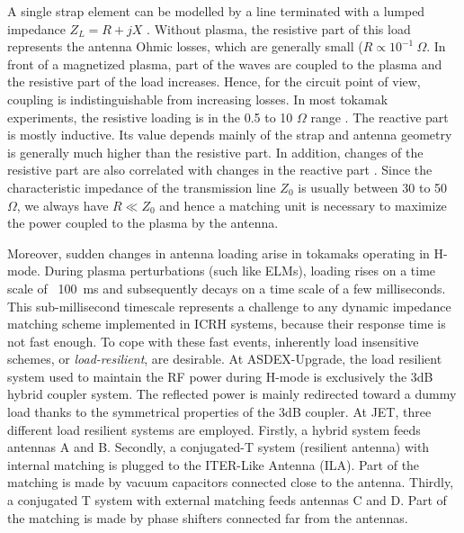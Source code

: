 A single strap element can be modelled by a line terminated with a lumped impedance $Z_L = R + j X$ . Without plasma, the resistive part of this load represents the antenna Ohmic losses, which are generally small ($R \propto 10^{-1}~\si{\Omega}$. In front of a magnetized plasma, part of the waves are coupled to the plasma and the resistive part of the load increases. Hence, for the circuit point of view, coupling is indistinguishable from increasing losses. In most tokamak experiments, the resistive loading is in the 0.5 to 10 $\si{\Omega}$ range . The reactive part is mostly inductive. Its value depends mainly of the strap and antenna geometry is generally much higher than the resistive part. In addition, changes of the resistive part are also correlated with changes in the reactive part \cite{pinsker1998}. Since the characteristic impedance of the transmission line $Z_0$ is usually between 30 to 50~$\si{\Omega}$, we always have $R \ll Z_0$ and hence a matching unit is necessary to maximize the power coupled to the plasma by the antenna.

Moreover, sudden changes in antenna loading arise in tokamaks operating in H-mode. During plasma perturbations (such like ELMs), loading rises on a time scale of ~100~ms and subsequently decays on a time scale of a few milliseconds. This sub-millisecond timescale represents a challenge to any dynamic impedance matching scheme implemented in ICRH systems, because their response time is not fast enough. To cope with these fast events, inherently load insensitive schemes, or \textit{load-resilient}, are desirable. At ASDEX-Upgrade, the load resilient system used to maintain the RF power during H-mode is exclusively the 3dB hybrid coupler system. The reflected power is mainly redirected toward a dummy load thanks to the symmetrical properties of the 3dB coupler. At JET, three different load resilient systems are employed. Firstly, a hybrid system feeds antennas A and B. Secondly, a conjugated-T system (resilient antenna) with internal matching is plugged to the ITER-Like Antenna (ILA). Part of the matching is made by vacuum capacitors connected close to the antenna. Thirdly, a conjugated T system with external matching feeds antennas C and D. Part of the matching is made by phase shifters connected far from the antennas.


